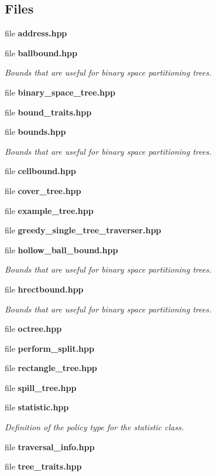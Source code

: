 \subsection*{Files}
\begin{DoxyCompactItemize}
\item 
file {\bf address.\+hpp}
\item 
file {\bf ballbound.\+hpp}
\begin{DoxyCompactList}\small\item\em Bounds that are useful for binary space partitioning trees. \end{DoxyCompactList}\item 
file {\bf binary\+\_\+space\+\_\+tree.\+hpp}
\item 
file {\bf bound\+\_\+traits.\+hpp}
\item 
file {\bf bounds.\+hpp}
\begin{DoxyCompactList}\small\item\em Bounds that are useful for binary space partitioning trees. \end{DoxyCompactList}\item 
file {\bf cellbound.\+hpp}
\item 
file {\bf cover\+\_\+tree.\+hpp}
\item 
file {\bf example\+\_\+tree.\+hpp}
\item 
file {\bf greedy\+\_\+single\+\_\+tree\+\_\+traverser.\+hpp}
\item 
file {\bf hollow\+\_\+ball\+\_\+bound.\+hpp}
\begin{DoxyCompactList}\small\item\em Bounds that are useful for binary space partitioning trees. \end{DoxyCompactList}\item 
file {\bf hrectbound.\+hpp}
\begin{DoxyCompactList}\small\item\em Bounds that are useful for binary space partitioning trees. \end{DoxyCompactList}\item 
file {\bf octree.\+hpp}
\item 
file {\bf perform\+\_\+split.\+hpp}
\item 
file {\bf rectangle\+\_\+tree.\+hpp}
\item 
file {\bf spill\+\_\+tree.\+hpp}
\item 
file {\bf statistic.\+hpp}
\begin{DoxyCompactList}\small\item\em Definition of the policy type for the statistic class. \end{DoxyCompactList}\item 
file {\bf traversal\+\_\+info.\+hpp}
\item 
file {\bf tree\+\_\+traits.\+hpp}
\end{DoxyCompactItemize}
